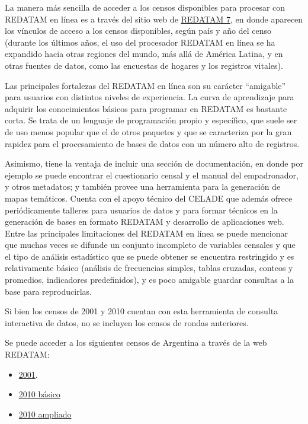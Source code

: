 \documentclass[
]{article}
\providecommand{\tightlist}{%
  \setlength{\itemsep}{0pt}\setlength{\parskip}{0pt}}
\begin{document}
La manera más sencilla de acceder a los censos disponibles para procesar con REDATAM en línea es a través del sitio web de \href{https://www.cepal.org/es/temas/redatam/download-redatam}{REDATAM 7}, en donde aparecen los vínculos de acceso a los censos disponibles, según país y año del censo (durante los últimos años, el uso del procesador REDATAM en línea se ha expandido hacia otras regiones del mundo, más allá de América Latina, y en otras fuentes de datos, como las encuestas de hogares y los registros vitales).

Las principales fortalezas del REDATAM en línea son su carácter ``amigable'' para usuarios con distintos niveles de experiencia. La curva de aprendizaje para adquirir los conocimientos básicos para programar en REDATAM es bastante corta. Se trata de un lenguaje de programación propio y específico, que suele ser de uso menos popular que el de otros paquetes y que se caracteriza por la gran rapidez para el procesamiento de bases de datos con un número alto de registros.

Asimismo, tiene la ventaja de incluir una sección de documentación, en donde por ejemplo se puede encontrar el cuestionario censal y el manual del empadronador, y otros metadatos; y también provee una herramienta para la generación de mapas temáticos. Cuenta con el apoyo técnico del CELADE que además ofrece periódicamente talleres para usuarios de datos y para formar técnicos en la generación de bases en formato REDATAM y desarrollo de aplicaciones web. Entre las principales limitaciones del REDATAM en línea se puede mencionar que muchas veces se difunde un conjunto incompleto de variables censales y que el tipo de análisis estadístico que se puede obtener se encuentra restringido y es relativamente básico (análisis de frecuencias simples, tablas cruzadas, conteos y promedios, indicadores predefinidos), y es poco amigable guardar consultas a la base para reproducirlas.

Si bien los censos de 2001 y 2010 cuentan con esta herramienta de consulta interactiva de datos, no se incluyen los censos de rondas anteriores.

Se puede acceder a los siguientes censos de Argentina a través de la web REDATAM:

\begin{itemize}
\tightlist
\item
  \href{https://redatam.indec.gob.ar/argbin/RpWebEngine.exe/PortalAction?\&MODE=MAIN\&BASE=CPV2001ARG\&MAIN=WebServerMain.inl\&_ga=2.209433750.505137327.1603741558-822725481.1603741558}{2001}.
\item
  \href{https://redatam.indec.gob.ar/argbin/RpWebEngine.exe/PortalAction?\&MODE=MAIN\&BASE=CPV2010B\&MAIN=WebServerMain.inl\&_ga=2.251878541.505137327.1603741558-822725481.1603741558}{2010 básico}
\item
  \href{https://redatam.indec.gob.ar/argbin/RpWebEngine.exe/PortalAction?\&MODE=MAIN\&BASE=CPV2010A\&MAIN=WebServerMain.inl\&_ga=2.248606851.505137327.1603741558-822725481.1603741558}{2010 ampliado}
\end{itemize}
\end{document}
